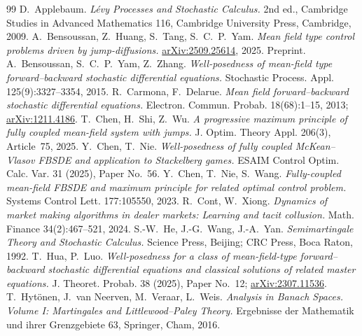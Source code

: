 \documentclass[preprint,12pt]{elsarticle}
\numberwithin{equation}{section}
\theoremstyle{plain}
\theoremstyle{definition}
\theoremstyle{\PaperRemarkStyle}
\begin{document}
 \begin{thebibliography}{99}
 D.~Applebaum.
  \emph{L\'evy Processes and Stochastic Calculus.} 2nd ed., Cambridge Studies in Advanced
  Mathematics 116, Cambridge University Press, Cambridge, 2009.
 A.~Bensoussan, Z.~Huang, S.~Tang, S.~C.~P.~Yam.
  \emph{Mean field type control problems driven by jump-diffusions.}
  \href{https://arxiv.org/abs/2509.25614}{arXiv:2509.25614}, 2025. Preprint.
 A.~Bensoussan, S.~C.~P.~Yam, Z.~Zhang.
  \emph{Well-posedness of mean-field type forward--backward stochastic differential
  equations.} Stochastic Process. Appl. 125(9):3327--3354, 2015.
 R.~Carmona, F.~Delarue.
  \emph{Mean field forward--backward stochastic differential equations.}
  Electron. Commun. Probab. 18(68):1--15, 2013;
  \href{https://arxiv.org/abs/1211.4186}{arXiv:1211.4186}.
 T.~Chen, H.~Shi, Z.~Wu.
  \emph{A progressive maximum principle of fully coupled mean-field system with jumps.}
  J. Optim. Theory Appl. 206(3), Article~75, 2025.
 Y.~Chen, T.~Nie.
  \emph{Well-posedness of fully coupled McKean--Vlasov FBSDE and application to
  Stackelberg games.} ESAIM Control Optim. Calc. Var. 31 (2025), Paper No.~56.
 Y.~Chen, T.~Nie, S.~Wang.
  \emph{Fully-coupled mean-field FBSDE and maximum principle for related optimal
  control problem.} Systems Control Lett. 177:105550, 2023.
 R.~Cont, W.~Xiong.
  \emph{Dynamics of market making algorithms in dealer markets: Learning and tacit
  collusion.} Math. Finance 34(2):467--521, 2024.
 S.-W.~He, J.-G.~Wang, J.-A.~Yan.
  \emph{Semimartingale Theory and Stochastic Calculus.} Science Press, Beijing; CRC
  Press, Boca Raton, 1992.
 T.~Hua, P.~Luo.
  \emph{Well-posedness for a class of mean-field-type forward--backward stochastic
  differential equations and classical solutions of related master equations.}
  J. Theoret. Probab. 38 (2025), Paper No.~12;
  \href{https://arxiv.org/abs/2307.11536}{arXiv:2307.11536}.
 T.~Hyt\"onen, J.~van Neerven, M.~Veraar, L.~Weis.
  \emph{Analysis in Banach Spaces. Volume I: Martingales and Littlewood--Paley Theory.}
  Ergebnisse der Mathematik und ihrer Grenzgebiete 63, Springer, Cham,
  2016.

\end{thebibliography}
\end{document}
